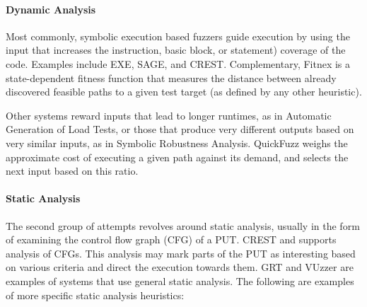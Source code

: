 \documentclass{article}
\begin{document}
\begin{multicols}{2}
    \paragraph{Dynamic Analysis} Most commonly, symbolic execution based fuzzers guide execution by using the input that increases the instruction, basic block, or statement) coverage of the code. Examples include EXE\cite{EXE}, SAGE\cite{SAGE}, and CREST\cite{CREST}. Complementary, Fitnex\cite{Fitnex} is a state-dependent fitness function that measures the distance between already discovered feasible paths to a given test target (as defined by any other heuristic).

    Other systems reward inputs that lead to longer runtimes, as in Automatic Generation of Load Tests\cite{AGLT}, or those that produce very different outputs based on very similar inputs, as in Symbolic Robustness Analysis\cite{SRA}. QuickFuzz\cite{QuickFuzz} weighs the approximate cost of executing a given path against its demand, and selects the next input based on this ratio.

    \paragraph{Static Analysis} The second group of attempts revolves around static analysis, usually in the form of examining the control flow graph (CFG) of a PUT. CREST\cite{CREST} \cite{ReviewThreeDecades} and supports analysis of CFGs. This analysis may mark parts of the PUT as interesting based on various criteria and direct the execution towards them. GRT\cite{GRT} and VUzzer\cite{VUzzer} are examples of systems that use general static analysis. The following are examples of more specific static analysis heuristics:


\end{multicols}
\end{document}

